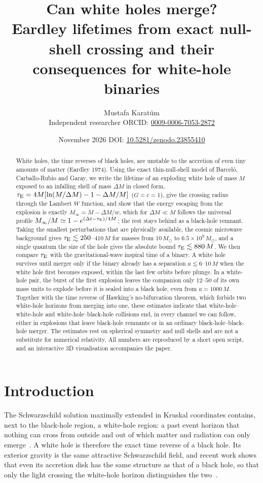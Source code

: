 \documentclass[11pt,a4paper]{article}
\title{Can white holes merge?\\[4pt]
\large Eardley lifetimes from exact null-shell crossing and their consequences for white-hole binaries}
\author{Mustafa Karatüm\\[2pt]
\small Independent researcher \quad ORCID: \href{https://orcid.org/0009-0006-7053-2872}{0009-0006-7053-2872}}
\date{November 2026 \quad DOI: \href{https://doi.org/10.5281/zenodo.23855410}{10.5281/zenodo.23855410}}
\newcommand{\dM}{\Delta M}
\newcommand{\tauE}{\tau_{\rm E}}
\newcommand{\Msun}{M_\odot}
\begin{document}
\maketitle

\begin{abstract}
White holes, the time reverses of black holes, are unstable to the accretion of even tiny amounts of matter (Eardley 1974). Using the exact thin-null-shell model of Barceló, Carballo-Rubio and Garay, we write the lifetime of an exploding white hole of mass $M$ exposed to an infalling shell of mass $\dM$ in closed form, $\tauE = 4M[\ln(M/\dM) - 1 - \dM/M]$ ($G=c=1$), give the crossing radius through the Lambert $W$ function, and show that the energy escaping from the explosion is exactly $M_\infty = M - \dM/w$, which for $\dM \ll M$ follows the universal profile $M_\infty/M \simeq 1 - e^{(\Delta t-\tauE)/4M}$; the rest stays behind as a black-hole remnant. Taking the smallest perturbations that are physically available, the cosmic microwave background gives $\tauE \lesssim 250$--$410\,M$ for masses from $10\,\Msun$ to $6.5\times10^{9}\,\Msun$, and a single quantum the size of the hole gives the absolute bound $\tauE \lesssim 880\,M$. We then compare $\tauE$ with the gravitational-wave inspiral time of a binary. A white hole survives until merger only if the binary already has a separation $a \lesssim 6$--$10\,M$ when the white hole first becomes exposed, within the last few orbits before plunge. In a white-hole pair, the burst of the first explosion leaves the companion only $12$--$50$ of its own mass units to explode before it is sealed into a black hole, even from $a = 1000\,M$. Together with the time reverse of Hawking's no-bifurcation theorem, which forbids two white-hole horizons from merging into one, these estimates indicate that white-hole--white-hole and white-hole--black-hole collisions end, in every channel we can follow, either in explosions that leave black-hole remnants or in an ordinary black-hole--black-hole merger. The estimates rest on spherical symmetry and null shells and are not a substitute for numerical relativity. All numbers are reproduced by a short open script, and an interactive 3D visualisation accompanies the paper.
\end{abstract}

\section{Introduction}

The Schwarzschild solution maximally extended in Kruskal coordinates contains, next to the black-hole region, a white-hole region: a past event horizon that nothing can cross from outside and out of which matter and radiation can only emerge~\cite{HawkingEllis}. A white hole is therefore the exact time reverse of a black hole. Its exterior gravity is the same attractive Schwarzschild field, and recent work shows that even its accretion disk has the same structure as that of a black hole, so that only the light crossing the white-hole horizon distinguishes the two~\cite{Li2025}.
\end{document}
